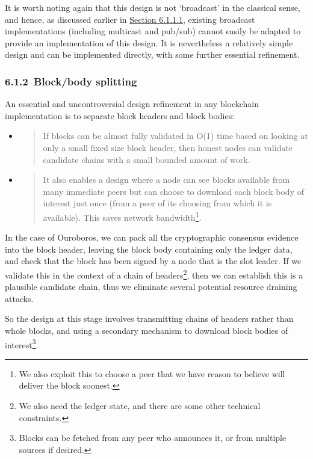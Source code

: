 \documentclass[]{article}
\begin{document}
It is worth noting again that this design is not `broadcast' in the
classical sense, and hence, as discussed earlier in
\protect\hyperlink{the-ouroboros-specification}{{Section 6.1.1.1}},
existing broadcast implementations (including multicast and pub/sub)
cannot easily be adapted to provide an implementation of this design. It
is nevertheless a relatively simple design and can be implemented
directly, with some further essential refinement.

\hypertarget{blockbody-splitting}{%
\subsubsection{​6.1.2​~Block/body splitting}\label{blockbody-splitting}}

An essential and uncontroversial design refinement in any blockchain
implementation is to separate block headers and block bodies:

\begin{itemize}
\item
  \begin{quote}
  If blocks can be almost fully validated in O(1) time based on looking
  at only a small fixed size block header, then honest nodes can
  validate candidate chains with a small bounded amount of work.
  \end{quote}
\item
  \begin{quote}
  It also enables a design where a node can see blocks available from
  many immediate peers but can choose to download each block body of
  interest just once (from a peer of its choosing from which it is
  available). This saves network bandwidth\footnote{We also exploit this
    to choose a peer that we have reason to believe will deliver the
    block soonest.}.
  \end{quote}
\end{itemize}

In the case of Ouroboros, we can pack all the cryptographic consensus
evidence into the block header, leaving the block body containing only
the ledger data, and check that the block has been signed by a node that
is the slot leader. If we validate this in the context of a chain of
headers\footnote{We also need the ledger state, and there are some other
  technical constraints.}, then we can establish this is a plausible
candidate chain, thus we eliminate several potential resource draining
attacks.

So the design at this stage involves transmitting chains of headers
rather than whole blocks, and using a secondary mechanism to download
block bodies of interest\footnote{Blocks can be fetched from any peer
  who announces it, or from multiple sources if desired.}.
\end{document}
